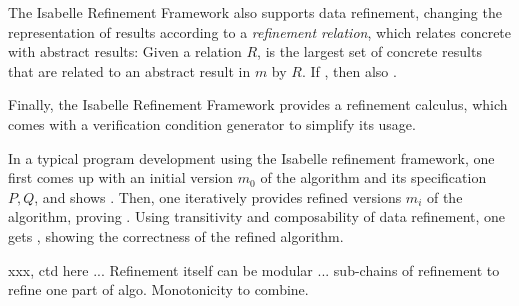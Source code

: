 \documentclass{llncs}
\begin{document}
The Isabelle Refinement Framework also supports data refinement, changing the representation of results according to a \emph{refinement relation}, 
which relates concrete with abstract results: Given a relation $R$,  is the largest set of concrete results that are related to an 
abstract result in $m$ by $R$. If , then also .

Finally, the Isabelle Refinement Framework provides a refinement calculus, which comes with a verification condition 
generator to simplify its usage.

In a typical program development using the Isabelle refinement framework, one first comes up with an initial version $m_0$ of
the algorithm and its specification $P,Q$, and shows . Then, one iteratively provides refined versions $m_i$ of the algorithm,
proving . Using transitivity and composability of data refinement, one 
gets , showing the correctness of the refined algorithm.

xxx, ctd here ...
Refinement itself can be modular ... sub-chains of refinement to refine one part of algo. Monotonicity to combine.





% 
% 
% 
% 
% 
% 
% 
% 
% 
% 
\end{document}
